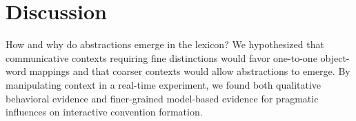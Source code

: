 \documentclass[10pt,letterpaper]{article}
\newcommand{\ndg}[1]{\textcolor{Green}{[ndg: #1]}}
\begin{document}



\section{Discussion}

How and why do abstractions emerge in the lexicon? We hypothesized that communicative contexts requiring fine distinctions would favor one-to-one object-word mappings and that coarser contexts would allow abstractions to emerge. By manipulating context in a real-time experiment, we found both qualitative behavioral evidence and finer-grained model-based evidence for pragmatic influences on interactive convention formation.
\end{document}
